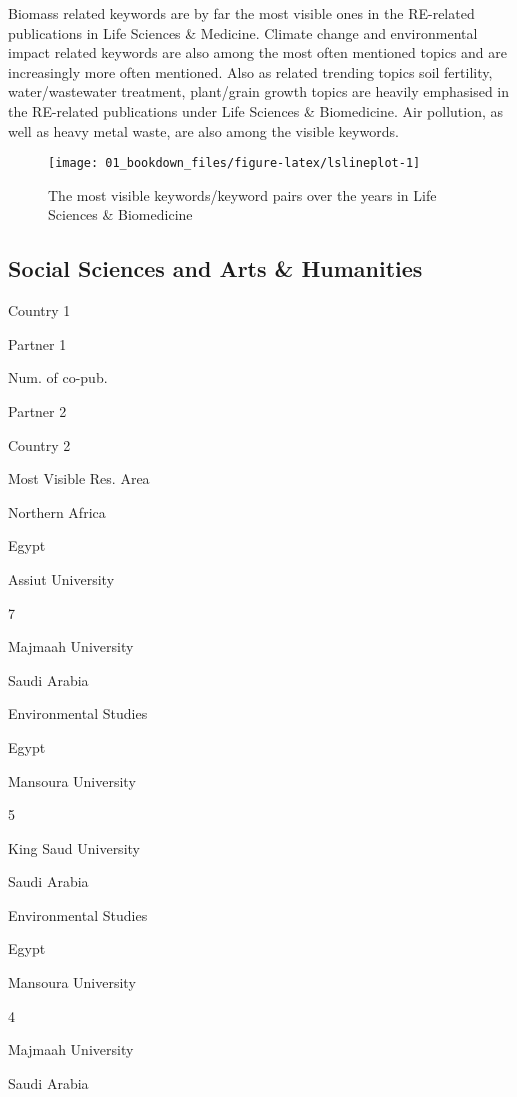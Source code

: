\documentclass[12pt,twoside]{report}
\begin{document}
Biomass related keywords are by far the most visible ones in the RE-related publications in Life Sciences \& Medicine. Climate change and environmental impact related keywords are also among the most often mentioned topics and are increasingly more often mentioned. Also as related trending topics soil fertility, water/wastewater treatment, plant/grain growth topics are heavily emphasised in the RE-related publications under Life Sciences \& Biomedicine. Air pollution, as well as heavy metal waste, are also among the visible keywords.

\begin{figure}
\texttt{[image: 01\_bookdown\_files/figure-latex/lslineplot-1]} \caption{The most visible keywords/keyword pairs over the years in Life Sciences & Biomedicine}\label{fig:lslineplot}
\end{figure}

\hypertarget{social-sciences-and-arts-humanities}{%
\subsection{Social Sciences and Arts \& Humanities}\label{social-sciences-and-arts-humanities}}

Country 1

Partner 1

Num. of co-pub.

Partner 2

Country 2

Most Visible Res. Area

Northern Africa

{Egypt }

{Assiut University }

{7 }

{Majmaah University }

{Saudi Arabia }

{Environmental Studies }

{Egypt }

{Mansoura University }

{5 }

{King Saud University }

{Saudi Arabia }

{Environmental Studies }

{Egypt }

{Mansoura University }

{4 }

{Majmaah University }

{Saudi Arabia }
\end{document}
